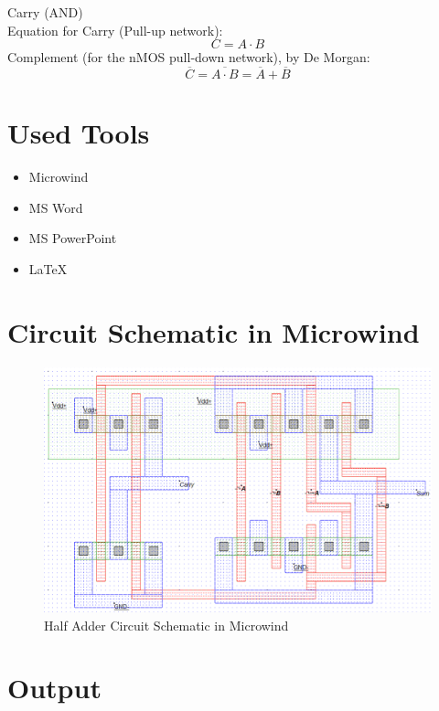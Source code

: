 \documentclass[12pt]{article}
\begin{document}
Carry (AND)\\
Equation for Carry (Pull-up network):
\[
  C = A\cdot B
\]
Complement (for the nMOS pull‑down network), by De Morgan:
\[
  \overline{C} = \overline{A\cdot B} = \overline{A} + \overline{B}
\]



\section*{Used Tools}
\begin{itemize}
  \item Microwind
  \item MS Word
  \item MS PowerPoint
  \item \LaTeX
\end{itemize}

\section*{Circuit Schematic in Microwind}

\begin{figure}[H]
  \centering
  \includegraphics[width=\textwidth]{mCkt.png}
  \caption{Half Adder Circuit Schematic in Microwind}
\end{figure}

\section*{Output}
\end{document}
